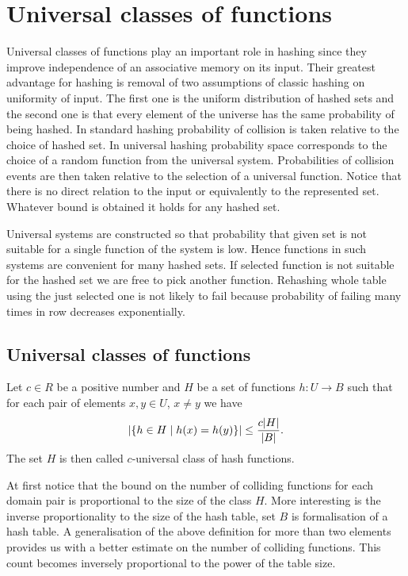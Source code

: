 \chapter{Universal classes of functions}

Universal classes of functions play an important role in hashing since they improve independence of an associative memory on its input. Their greatest advantage for hashing is removal of two assumptions of classic hashing on uniformity of input. The first one is the uniform distribution of hashed sets and the second one is that every element of the universe has the same probability of being hashed. In standard hashing probability of collision is taken relative to the choice of hashed set. In universal hashing probability space corresponds to the choice of a random function from the universal system. Probabilities of collision events are then taken relative to the selection of a universal function. Notice that there is no direct relation to the input or equivalently to the represented set. Whatever bound is obtained it holds for any hashed set. 

Universal systems are constructed so that probability that given set is not suitable for a single function of the system is low. Hence functions in such systems are convenient for many hashed sets. If selected function is not suitable for the hashed set we are free to pick another function. Rehashing whole table using the just selected one is not likely to fail because probability of failing many times in row decreases exponentially.

\section{Universal classes of functions}

\begin{definition}
\label{c_universal_system}
Let $c \in R$ be a positive number and $H$ be a set of functions $h: U \rightarrow B$ such that for each pair of elements $x, y \in U$, $x \neq y$ we have \[ \left| \lbrace h \in H \mid h(x) = h(y) \rbrace \right| \leq \frac {c |H|}{|B|} \text{.} \] The set $H$ is then called $c$-universal class of hash functions.
\end{definition}

At first notice that the bound on the number of colliding functions for each domain pair is proportional to the size of the class $H$. More interesting is the inverse proportionality to the size of the hash table, set $B$ is formalisation of a hash table. A generalisation of the above definition for more than two elements provides us with a better estimate on the number of colliding functions. This count becomes inversely proportional to the power of the table size.

